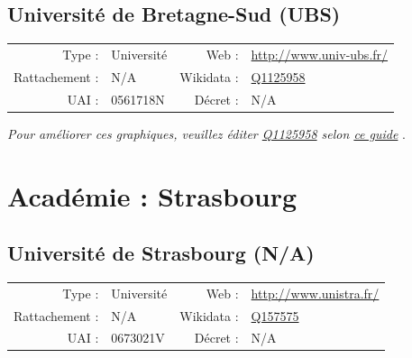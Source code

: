 \documentclass[11pt,french,landscape]{article}
\begin{document}
\newpage

\hypertarget{universituxe9-de-bretagne-sud-ubs}{%
\subsection{Université de Bretagne-Sud
(UBS)}\label{universituxe9-de-bretagne-sud-ubs}}

\begin{tabular*}{0.45\textwidth}{rp{2cm}rl}  
\hline  
Type : & Université & Web : &\href{http://www.univ-ubs.fr/}{http://www.univ-ubs.fr/} \\  
Rattachement : & N/A & Wikidata : & \href{https://www.wikidata.org/entity/Q1125958}{Q1125958} \\  
UAI : & 0561718N & Décret : & N/A \\  
\hline  
\end{tabular*}

\textit{\scriptsize Pour améliorer ces graphiques, veuillez éditer \href{https://www.wikidata.org/entity/Q1125958}{Q1125958}  selon \href{https://github.com/cpesr/wikidataESR/blob/master/Rmd/wikidataESR.md}{ce guide}}
.


\newpage

\hypertarget{acaduxe9mie-strasbourg}{%
\section{Académie : Strasbourg}\label{acaduxe9mie-strasbourg}}

\hypertarget{universituxe9-de-strasbourg-na}{%
\subsection{Université de Strasbourg
(N/A)}\label{universituxe9-de-strasbourg-na}}

\begin{tabular*}{0.45\textwidth}{rp{2cm}rl}  
\hline  
Type : & Université & Web : &\href{http://www.unistra.fr/}{http://www.unistra.fr/} \\  
Rattachement : & N/A & Wikidata : & \href{https://www.wikidata.org/entity/Q157575}{Q157575} \\  
UAI : & 0673021V & Décret : & N/A \\  
\hline  
\end{tabular*}
\end{document}
